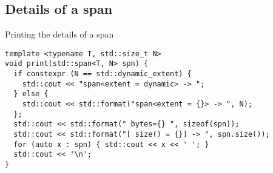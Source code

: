\subsection{Details of a span}

\begin{frame}[t,fragile]
\begin{block}{Printing the details of a span}
\begin{lstlisting}
template <typename T, std::size_t N>
void print(std::span<T, N> spn) {
  if constexpr (N == std::dynamic_extent) {
    std::cout << "span<extent = dynamic> -> ";
  } else {
    std::cout << std::format("span<extent = {}> -> ", N);
  };
  std::cout << std::format(" bytes={} ", sizeof(spn));
  std::cout << std::format("[ size() = {}] -> ", spn.size());
  for (auto x : spn) { std::cout << x << ' '; }
  std::cout << '\n';
}
\end{lstlisting}
\end{block}
\end{frame}
